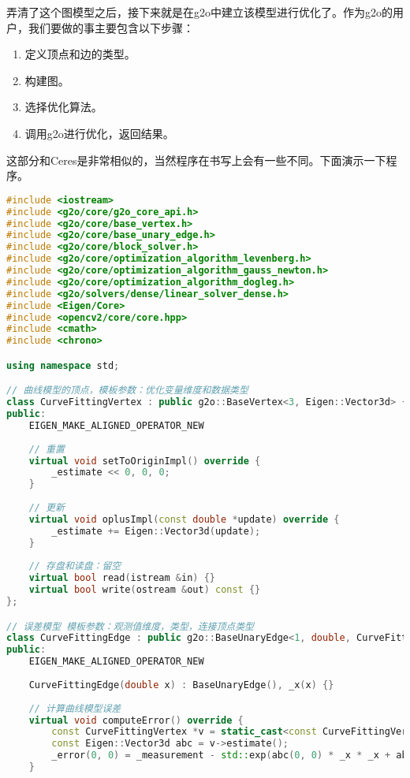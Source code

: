 弄清了这个图模型之后，接下来就是在g2o中建立该模型进行优化了。作为g2o的用户，我们要做的事主要包含以下步骤：

\begin{enumerate}
	\item 定义顶点和边的类型。
	\item 构建图。
	\item 选择优化算法。
	\item 调用g2o进行优化，返回结果。
\end{enumerate}

这部分和Ceres是非常相似的，当然程序在书写上会有一些不同。下面演示一下程序。

\begin{lstlisting}[language=c++,caption=slambook/ch6/g2oCurveFitting.cpp]
#include <iostream>
#include <g2o/core/g2o_core_api.h>
#include <g2o/core/base_vertex.h>
#include <g2o/core/base_unary_edge.h>
#include <g2o/core/block_solver.h>
#include <g2o/core/optimization_algorithm_levenberg.h>
#include <g2o/core/optimization_algorithm_gauss_newton.h>
#include <g2o/core/optimization_algorithm_dogleg.h>
#include <g2o/solvers/dense/linear_solver_dense.h>
#include <Eigen/Core>
#include <opencv2/core/core.hpp>
#include <cmath>
#include <chrono>

using namespace std;

// 曲线模型的顶点，模板参数：优化变量维度和数据类型
class CurveFittingVertex : public g2o::BaseVertex<3, Eigen::Vector3d> {
public:
    EIGEN_MAKE_ALIGNED_OPERATOR_NEW
    
    // 重置
    virtual void setToOriginImpl() override {
        _estimate << 0, 0, 0;
    }
    
    // 更新
    virtual void oplusImpl(const double *update) override {
        _estimate += Eigen::Vector3d(update);
    }
    
    // 存盘和读盘：留空
    virtual bool read(istream &in) {}
    virtual bool write(ostream &out) const {}
};

// 误差模型 模板参数：观测值维度，类型，连接顶点类型
class CurveFittingEdge : public g2o::BaseUnaryEdge<1, double, CurveFittingVertex> {
public:
    EIGEN_MAKE_ALIGNED_OPERATOR_NEW
    
    CurveFittingEdge(double x) : BaseUnaryEdge(), _x(x) {}
    
    // 计算曲线模型误差
    virtual void computeError() override {
        const CurveFittingVertex *v = static_cast<const CurveFittingVertex *> (_vertices[0]);
        const Eigen::Vector3d abc = v->estimate();
        _error(0, 0) = _measurement - std::exp(abc(0, 0) * _x * _x + abc(1, 0) * _x + abc(2, 0));
    }
    

\end{lstlisting}
